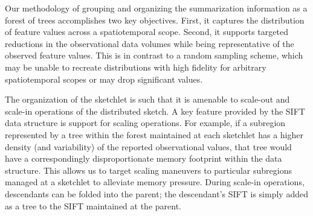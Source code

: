 Our methodology of grouping and organizing the summarization information as a forest of trees accomplishes two key objectives. First, it captures the distribution of feature values across a spatiotemporal scope. Second, it supports targeted reductions in the observational data volumes while being representative of the observed feature values. This is in contrast to a random sampling scheme, which may be unable to recreate distributions with high fidelity for arbitrary spatiotemporal scopes or may drop significant values.

The organization of the sketchlet is such that it is amenable to scale-out and scale-in operations of the distributed sketch. A key feature provided by the SIFT data structure is support for scaling operations. For example, if a subregion represented by a tree within the forest maintained at each sketchlet has a higher density (and variability) of the reported observational values, that tree would have a correspondingly disproportionate memory footprint within the data structure. This allows us to target scaling maneuvers to particular subregions managed at a sketchlet to alleviate memory pressure.  During scale-in operations, descendants can be folded into the parent; the descendant's SIFT is simply added as a tree to the SIFT maintained at the parent.
